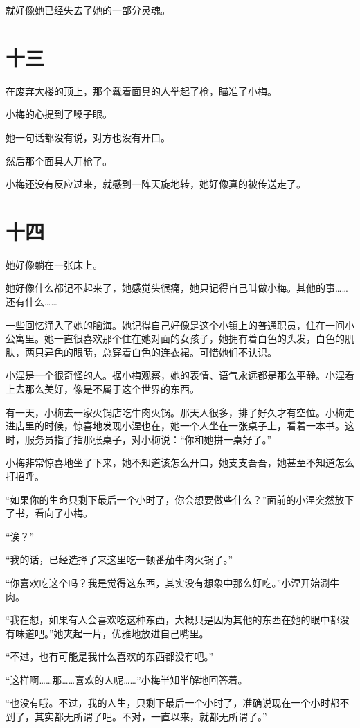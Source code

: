 \documentclass[12pt,a4paper]{ctexart}
\begin{document}
就好像她已经失去了她的一部分灵魂。

\section{十三}

在废弃大楼的顶上，那个戴着面具的人举起了枪，瞄准了小梅。

小梅的心提到了嗓子眼。

她一句话都没有说，对方也没有开口。

然后那个面具人开枪了。

小梅还没有反应过来，就感到一阵天旋地转，她好像真的被传送走了。

\section{十四}

她好像躺在一张床上。

她好像什么都记不起来了，她感觉头很痛，她只记得自己叫做小梅。其他的事……还有什么……

一些回忆涌入了她的脑海。她记得自己好像是这个小镇上的普通职员，住在一间小公寓里。她一直很喜欢那个住在她对面的女孩子，她拥有着白色的头发，白色的肌肤，两只异色的眼睛，总穿着白色的连衣裙。可惜她们不认识。

小涅是一个很奇怪的人。据小梅观察，她的表情、语气永远都是那么平静。小涅看上去那么美好，像是不属于这个世界的东西。

有一天，小梅去一家火锅店吃牛肉火锅。那天人很多，排了好久才有空位。小梅走进店里的时候，惊喜地发现小涅也在，她一个人坐在一张桌子上，看着一本书。这时，服务员指了指那张桌子，对小梅说：“你和她拼一桌好了。”

小梅非常惊喜地坐了下来，她不知道该怎么开口，她支支吾吾，她甚至不知道怎么打招呼。

“如果你的生命只剩下最后一个小时了，你会想要做些什么？”面前的小涅突然放下了书，看向了小梅。

“诶？”

“我的话，已经选择了来这里吃一顿番茄牛肉火锅了。”

“你喜欢吃这个吗？我是觉得这东西，其实没有想象中那么好吃。”小涅开始涮牛肉。

“我在想，如果有人会喜欢吃这种东西，大概只是因为其他的东西在她的眼中都没有味道吧。”她夹起一片，优雅地放进自己嘴里。

“不过，也有可能是我什么喜欢的东西都没有吧。”

“这样啊……那……喜欢的人呢……”小梅半知半解地回答着。

“也没有哦。不过，我的人生，只剩下最后一个小时了，准确说现在一个小时都不到了，其实都无所谓了吧。不对，一直以来，就都无所谓了。”
\end{document}
